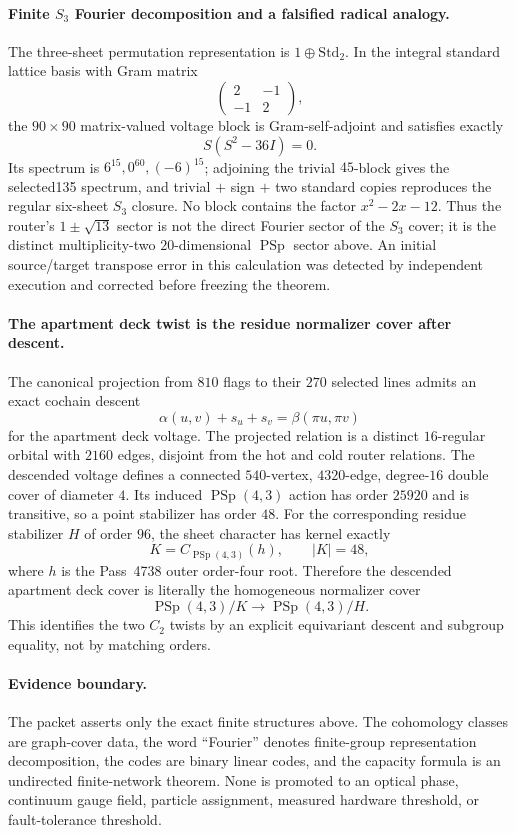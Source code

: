 \paragraph{Finite $S_3$ Fourier decomposition and a falsified radical analogy.}
The three-sheet permutation representation is $1\oplus\mathrm{Std}_2$.  In the integral standard lattice basis with Gram matrix
\[
  \begin{pmatrix}2&-1\\-1&2\end{pmatrix},
\]
the $90\times90$ matrix-valued voltage block is Gram-self-adjoint and satisfies exactly
\[
  S(S^2-36I)=0.
\]
Its spectrum is $6^{15},0^{60},(-6)^{15}$; adjoining the trivial $45$-block gives the selected135 spectrum, and trivial $+$ sign $+$ two standard copies reproduces the regular six-sheet $S_3$ closure.  No block contains the factor $x^2-2x-12$.  Thus the router's $1\pm\sqrt{13}$ sector is not the direct Fourier sector of the $S_3$ cover; it is the distinct multiplicity-two $20$-dimensional $\operatorname{PSp}$ sector above.  An initial source/target transpose error in this calculation was detected by independent execution and corrected before freezing the theorem.

\paragraph{The apartment deck twist is the residue normalizer cover after descent.}
The canonical projection from $810$ flags to their $270$ selected lines admits an exact cochain descent
\[
  \alpha(u,v)+s_u+s_v=\beta(\pi u,\pi v)
\]
for the apartment deck voltage.  The projected relation is a distinct $16$-regular orbital with $2160$ edges, disjoint from the hot and cold router relations.  The descended voltage defines a connected $540$-vertex, $4320$-edge, degree-$16$ double cover of diameter $4$.  Its induced $\operatorname{PSp}(4,3)$ action has order $25920$ and is transitive, so a point stabilizer has order $48$.  For the corresponding residue stabilizer $H$ of order $96$, the sheet character has kernel exactly
\[
  K=C_{\operatorname{PSp}(4,3)}(h),\qquad |K|=48,
\]
where $h$ is the Pass~4738 outer order-four root.  Therefore the descended apartment deck cover is literally the homogeneous normalizer cover
\[
  \operatorname{PSp}(4,3)/K\longrightarrow \operatorname{PSp}(4,3)/H.
\]
This identifies the two $C_2$ twists by an explicit equivariant descent and subgroup equality, not by matching orders.

\paragraph{Evidence boundary.}
The packet asserts only the exact finite structures above.  The cohomology classes are graph-cover data, the word ``Fourier'' denotes finite-group representation decomposition, the codes are binary linear codes, and the capacity formula is an undirected finite-network theorem.  None is promoted to an optical phase, continuum gauge field, particle assignment, measured hardware threshold, or fault-tolerance threshold.

